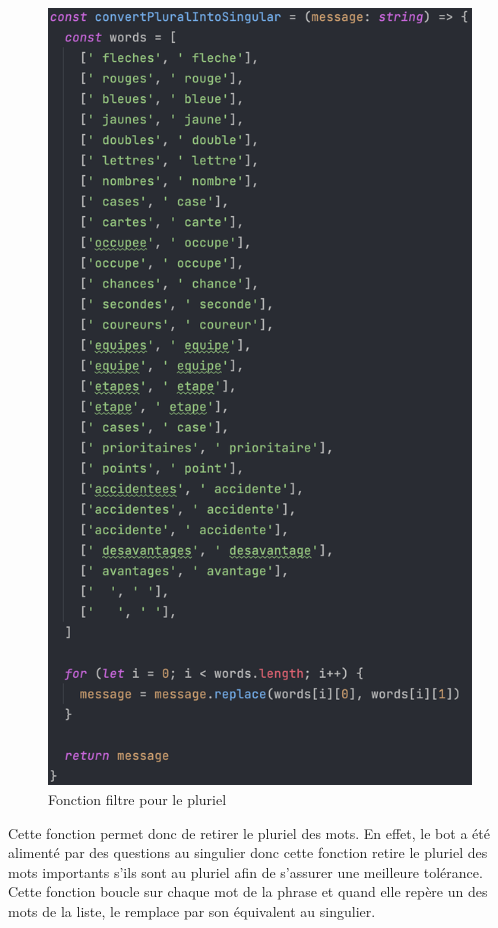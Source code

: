 \documentclass[a4paper, 11pt]{article}
\begin{document}
\begin{figure}[!h]
	\centering
	\includegraphics[scale=.6]{assets/fonction-pluriel.png}
	\caption{Fonction filtre pour le pluriel}
\end{figure}

\newpage

Cette fonction permet donc de retirer le pluriel des mots. En effet, le bot a été alimenté par des questions au singulier donc cette fonction retire le pluriel des mots importants s'ils sont au pluriel afin de s'assurer une meilleure tolérance. Cette fonction boucle sur chaque mot de la phrase et quand elle repère un des mots de la liste, le remplace par son équivalent au singulier.\newline
\end{document}
